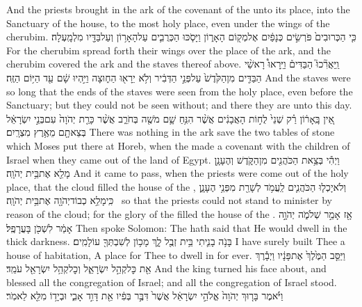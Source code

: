 {And the priests brought in the ark of the covenant of the \lord\space unto its place, into the Sanctuary of the house, to the most holy place, even under the wings of the cherubim.}
{כִּ֤י הַכְּרוּבִים֙ פֹּרְשִׂ֣ים כְּנָפַ֔יִם אֶל\maqqaf מְק֖וֹם הָאָר֑וֹן וַיָּסֹ֧כּוּ הַכְּרֻבִ֛ים עַל\maqqaf הָאָר֥וֹן וְעַל\maqqaf בַּדָּ֖יו מִלְמָֽעְלָה׃}
{For the cherubim spread forth their wings over the place of the ark, and the cherubim covered the ark and the staves thereof above.}
{וַֽיַּאֲרִ֘כוּ֮ הַבַּדִּים֒ וַיֵּֽרָאוּ֩ רָאשֵׁ֨י הַבַּדִּ֤ים מִן\maqqaf הַקֹּ֙דֶשׁ֙ עַל\maqqaf פְּנֵ֣י הַדְּבִ֔יר וְלֹ֥א יֵרָא֖וּ הַח֑וּצָה וַיִּ֣הְיוּ שָׁ֔ם עַ֖ד הַיּ֥וֹם הַזֶּֽה׃}
{And the staves were so long that the ends of the staves were seen from the holy place, even before the Sanctuary; but they could not be seen without; and there they are unto this day.}
{אֵ֚ין בָּֽאָר֔וֹן רַ֗ק שְׁנֵי֙ לֻח֣וֹת הָאֲבָנִ֔ים אֲשֶׁ֨ר הִנִּ֥חַ שָׁ֛ם מֹשֶׁ֖ה בְּחֹרֵ֑ב אֲשֶׁ֨ר כָּרַ֤ת יְהֹוָה֙ עִם\maqqaf בְּנֵ֣י יִשְׂרָאֵ֔ל בְּצֵאתָ֖ם מֵאֶ֥רֶץ מִצְרָֽיִם׃}
{There was nothing in the ark save the two tables of stone which Moses put there at Horeb, when the \lord\space made a covenant with the children of Israel when they came out of the land of Egypt.}
{וַיְהִ֕י בְּצֵ֥את הַכֹּהֲנִ֖ים מִן\maqqaf הַקֹּ֑דֶשׁ וְהֶעָנָ֥ן מָלֵ֖א אֶת\maqqaf בֵּ֥ית יְהֹוָֽה׃}
{And it came to pass, when the priests were come out of the holy place, that the cloud filled the house of the \lord,}
{וְלֹא\maqqaf יָכְל֧וּ הַכֹּהֲנִ֛ים לַֽעֲמֹ֥ד לְשָׁרֵ֖ת מִפְּנֵ֥י הֶעָנָ֑ן כִּֽי\maqqaf מָלֵ֥א כְבוֹד\maqqaf יְהֹוָ֖ה אֶת\maqqaf בֵּ֥ית יְהֹוָֽה׃ \petucha }
{so that the priests could not stand to minister by reason of the cloud; for the glory of the \lord\space filled the house of the \lord.}
{אָ֖ז אָמַ֣ר שְׁלֹמֹ֑ה יְהֹוָ֣ה אָמַ֔ר לִשְׁכֹּ֖ן בָּעֲרָפֶֽל׃}
{Then spoke Solomon: The \lord\space hath said that He would dwell in the thick darkness.}
{בָּנֹ֥ה בָנִ֛יתִי בֵּ֥ית זְבֻ֖ל לָ֑ךְ מָכ֥וֹן לְשִׁבְתְּךָ֖ עוֹלָמִֽים׃}
{I have surely built Thee a house of habitation, A place for Thee to dwell in for ever.}
{וַיַּסֵּ֤ב הַמֶּ֙לֶךְ֙ אֶת\maqqaf פָּנָ֔יו וַיְבָ֕רֶךְ אֵ֖ת כׇּל\maqqaf קְהַ֣ל יִשְׂרָאֵ֑ל וְכׇל\maqqaf קְהַ֥ל יִשְׂרָאֵ֖ל עֹמֵֽד׃}
{And the king turned his face about, and blessed all the congregation of Israel; and all the congregation of Israel stood.}
{וַיֹּ֗אמֶר בָּר֤וּךְ יְהֹוָה֙ אֱלֹהֵ֣י יִשְׂרָאֵ֔ל אֲשֶׁר֙ דִּבֶּ֣ר בְּפִ֔יו אֵ֖ת דָּוִ֣ד אָבִ֑י וּבְיָד֥וֹ מִלֵּ֖א לֵאמֹֽר׃}
